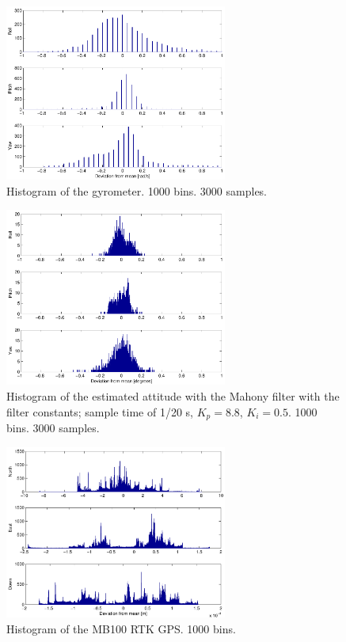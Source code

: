 \begin{figure}[h]
	\centering
	\includegraphics[width=0.65\textwidth]{pdf/gyrohist3000}
	\caption{Histogram of the gyrometer. 1000 bins. 3000 samples.}
	\label{fig:gyrohist3000}
\end{figure}

\begin{figure}[h]
	\centering
	\includegraphics[width=0.65\textwidth]{pdf/mahonyhist3000}
	\caption{Histogram of the estimated attitude with the Mahony filter
	with the filter constants; sample time of 1/20 s, $K_p = 8.8$, $K_i
= 0.5$. 1000 bins. 3000 samples.}
	\label{fig:mahonyhist3000}
\end{figure}

\begin{figure}[h]
	\centering
	\includegraphics[width=0.65\textwidth]{pdf/mb100hist1000000}
	\caption{Histogram of the MB100 \ac{RTK} \ac{GPS}. 1000 bins.}
	\label{fig:mb100hist1000000}
\end{figure}

